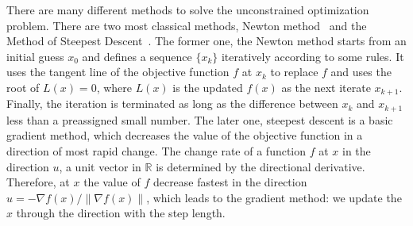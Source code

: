 \par There are many different methods to solve the unconstrained optimization problem. There are two most classical methods, Newton method~\citep{NT:36} and the Method of Steepest Descent~\citep{DP:09}. The former one, the Newton method starts from an initial guess $x_0$ and defines a sequence $\{x_k\}$
iteratively according to some rules. It uses the tangent line of the objective function $f$ at $x_k$ to replace $f$ and uses the root of $L(x) = 0$, where $L(x)$ is the updated $f(x)$ as the next iterate $x_{k+1}$. Finally, the iteration is terminated as long as the difference between $x_k$ and $x_{k+1}$ less than a preassigned small number. The later one, steepest descent is a basic gradient method, which decreases the value of the objective function in a direction of most rapid change. The change rate of a function $f$ at $x$ in the direction $u$, a unit vector in $\mathbb{R}$ is determined by the directional derivative. Therefore, at $x$ the value of $f$ decrease fastest in the direction $u=-\nabla f(x)/\|\nabla f(x)\|$, which leads to the gradient method: we update the $x$ through the direction with the step length. 


